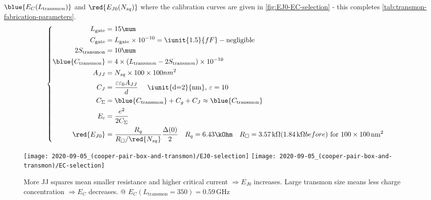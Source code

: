 \begin{framed}\noindent
  $\blue{E_C(L_{\text{transmon}})}$   and   $\red{E_{J0}(N_{sq})}$  where   the   calibration   curves  are   given   in
  \autoref{fig:EJ0-EC-selection} - this completes \autoref{tab:transmon-fabrication-parameters}.
  \begin{equation}
    \left\{
      \begin{aligned}
        L_\text{gate} & = 15\mum\\
        C_{\text{gate}} & = L_\text{gate} \times 10^{-10} = \iunit{1.5}{fF} - \text{negligible}\\
        2S_{\text{transmon}} & = 10\mum \\
        \blue{C_{\text{transmon}}} & = 4\times\left( L_{\text{transmon}} - 2S_{\text{transmon}} \right) \times 10^{-10} \\
        A_{JJ} &  = N_{sq} \times 100\times100nm^{2} \\
        C_J & = \frac{\varepsilon\varepsilon_0A_{JJ}}{d} \quad \text{
          \iunit{d=2}{nm}, $\varepsilon = 10$}\\
        C_{\Sigma} & = \blue{C_\text{transmon}} + C_g + C_J \approx \blue{C_\text{transmon}}\\
        E_c& = \frac{e^2}{2C_\Sigma}\\
        \red{E_{J0}} & = \frac{R_q}{R_{\square}/\red{N_{sq}}}\frac{\Delta(0)}{2} \quad R_q=6.43\kOhm \quad R_{\square} = 3.57\,\text{k}\Omega (1.84\,\text{k}\Omega before) \text{ for } 100 \times 100\,\text{nm}^2\\
      \end{aligned}\right.
  \end{equation}
\end{framed}

\begin{figure}[h]
  \centering%
  \texttt{[image: 2020-09-05\_(cooper-pair-box-and-transmon)/EJ0-selection]}%
  \texttt{[image: 2020-09-05\_(cooper-pair-box-and-transmon)/EC-selection]}
  \caption{\small More JJ  squares mean smaller resistance  and higher critical current  $\Rightarrow E_{J0}$ increases.
    Large    transmon    size    means    less     charge    concentration    $\Rightarrow    E_{C}$    decreases.     @
    $E_C(L_{\text{transmon}}=350) = 0.59\,$GHz\label{fig:EJ0-EC-selection}}
\end{figure}

